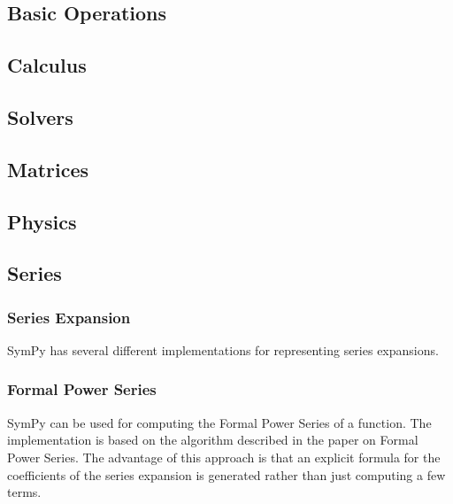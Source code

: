 
\subsection{Basic Operations}

\subsection{Calculus}

\subsection{Solvers}

\subsection{Matrices}

\subsection{Physics}

\subsection{Series}

\subsubsection{Series Expansion}

SymPy has several different implementations for representing series expansions.

\subsubsection{Formal Power Series}

SymPy can be used for computing the Formal Power Series of a function.
The implementation is based on the algorithm described in the paper on Formal Power Series\cite{Gruntz93formalpower}.
The advantage of this approach is that an explicit formula for the coefficients
of the series expansion is generated rather than just computing a few terms.

